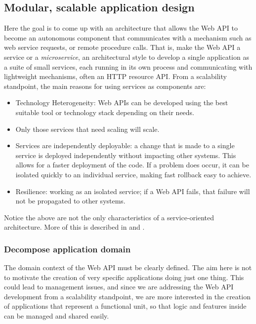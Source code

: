 \documentclass[10pt,article]{IEEEtran}
\begin{document}
  

 


\subsection{Modular, scalable application design}
Here the goal is to come up with an architecture that allows the Web API to become an autonomous component that communicates with a mechanism such as web service requests, or remote procedure calls. That is, make the Web API a service or a \textit{microservice}, an architectural style to develop a single application as a suite of small services, each running in its own process and communicating with lightweight mechanisms, often an HTTP resource API\cite{monolit:fowler}. From a scalability standpoint, the main reasons for using services as components are:
\begin{itemize}
    \item
    Technology Heterogeneity: Web APIs can be developed using the best suitable tool or technology stack depending on their needs.
    \item
    Only those services that need scaling will scale.
    \item
    Services are independently deployable: a change that is made to a single service is deployed  independently without impacting other systems. This allows for a faster deployment of the code. If a problem does occur, it can be isolated quickly to an individual service, making fast rollback easy to achieve.
    \item
    Resilience: working as an isolated service; if a Web API fails, that failure will not be propagated to other systems.
\end{itemize}

Notice the above are not the only characteristics of a service-oriented architecture. More of this is described in \cite{microservices} and \cite{monolit:fowler}. 

\subsubsection{Decompose application domain}
The domain context of the Web API must be clearly defined. The aim here is not to motivate the creation of very specific applications doing just one thing. This could lead to management issues, and since we are addressing the Web API development from a scalability standpoint, we are more interested in the creation of applications that represent a functional unit, so that logic and features inside can be managed and shared easily.
\end{document}
